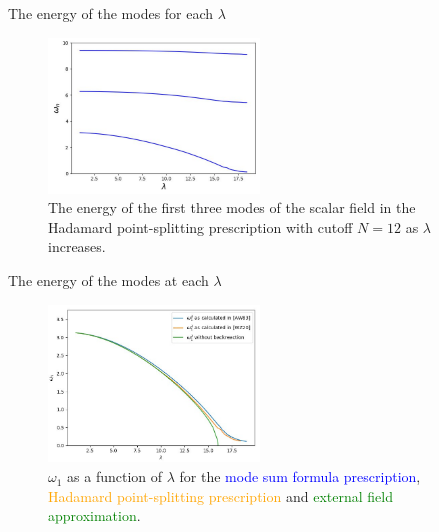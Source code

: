 \begin{frame}{The energy of the modes for each $\lambda$}
\begin{figure}[h]
	\centering
	\caption{The energy of the first three modes of the scalar field in the Hadamard point-splitting prescription with cutoff $N=12$ as $\lambda$ increases.}
	\label{fig:figures-eigenvalue-evolution-png}
	\includegraphics[width=0.5\textwidth]{figures/eigenvalue-evolution.png}
	
\end{figure}
\end{frame}
\begin{frame}{The energy of the modes at each $\lambda$}
\begin{figure}[h]
	\centering
	\caption{$\omega_1$ as a function of $\lambda$ for the \textcolor{blue}{mode sum formula prescription}, \textcolor{orange}{Hadamard point-splitting prescription} and \textcolor{green}{external field approximation}.}
	\label{fig:figures-eigenvalue-evolution-png}
	\includegraphics[width=0.5\textwidth]{figures/comparing-energies.png}
	
\end{figure}
\end{frame}


